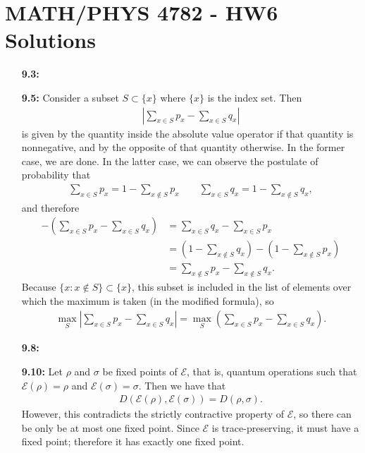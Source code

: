 \documentclass[a4paper,12pt]{article}
\begin{document}
	
\section*{MATH/PHYS 4782 - HW6 Solutions}

\begin{enumerate}
    \item[\textbf{9.3:}]

    \item[\textbf{9.5:}]
        Consider a subset $S \subset \{ x \}$ where $\{ x \}$ is the index set. Then
        \begin{align*}
            \left| \sum_{x \in S} p_x - \sum_{x \in S} q_x \right|
        \end{align*}
        is given by the quantity inside the absolute value operator if that quantity is nonnegative, and by the opposite of that quantity otherwise. In the former case, we are done. In the latter case, we can observe the postulate of probability that
        \begin{align*}
            \sum_{x \in S} p_x = 1 - \sum_{x \notin S} p_x \qquad \sum_{x \in S} q_x = 1 - \sum_{x \notin S} q_x,
        \end{align*}
        and therefore
        \begin{align*}
            -\left( \sum_{x \in S} p_x - \sum_{x \in S} q_x \right) &= \sum_{x \in S} q_x - \sum_{x \in S} p_x \\
            &= \left( 1 - \sum_{x \notin S} q_x \right) - \left( 1 - \sum_{x \notin S} p_x \right) \\
            &= \sum_{x \notin S} p_x - \sum_{x \notin S} q_x.
        \end{align*}
        Because $\{ x : x \notin S\} \subset \{ x \}$, this subset is included in the list of elements over which the maximum is taken (in the modified formula), so
        \begin{align*}
            \max_{S} \left| \sum_{x \in S} p_x - \sum_{x \in S} q_x \right| = \max_{S} \left( \sum_{x \in S} p_x - \sum_{x \in S} q_x \right).
        \end{align*}

    \item[\textbf{9.8:}]

    \item[\textbf{9.10:}]
        Let $\rho$ and $\sigma$ be fixed points of $\mathcal{E}$, that is, quantum operations such that $\mathcal{E}(\rho) = \rho$ and $\mathcal{E}(\sigma) = \sigma$. Then we have that
        \begin{align*}
            D(\mathcal{E}(\rho), \mathcal{E}(\sigma)) = D(\rho, \sigma).
        \end{align*}
        However, this contradicts the strictly contractive property of $\mathcal{E}$, so there can be only be at most one fixed point. Since $\mathcal{E}$ is trace-preserving, it must have a fixed point; therefore it has exactly one fixed point.


\end{enumerate}
\end{document}
